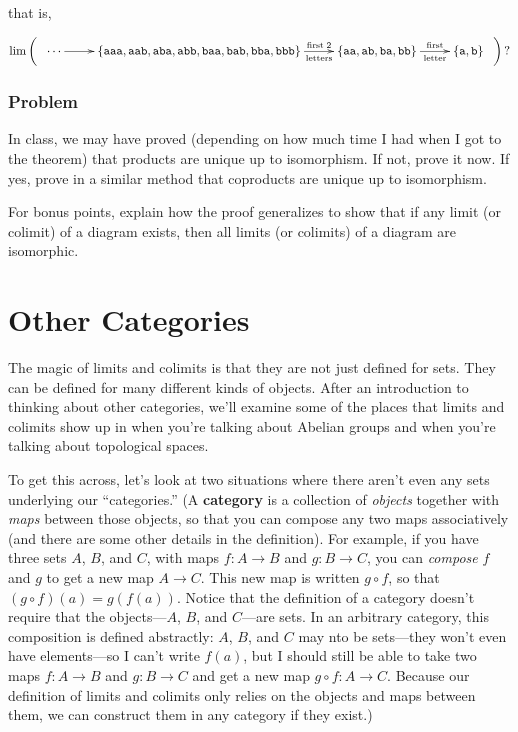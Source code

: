 \documentclass[12pt]{article}
\newcounter{problemcounter}
\newcounter{problempartcounter}
\newcommand{\problem}{\addtocounter{problemcounter}{1}\setcounter{problempartcounter}{0}\subsubsection*{Problem \theproblemcounter}}
\begin{document}
\noindent that is,

$$\textrm{lim} \left( \begin{array}{l}
\xymatrix{ \cdots\ar[r] & \{\mathtt{aaa}, \mathtt{aab}, \mathtt{aba}, \mathtt{abb}, \mathtt{baa}, \mathtt{bab}, \mathtt{bba}, \mathtt{bbb} \}\ar[r]^-{\textrm{first}\; 2}_-{\textrm{letters}} & \{\mathtt{aa}, \mathtt{ab}, \mathtt{ba}, \mathtt{bb} \}\ar[r]^-{\textrm{first}}_-{\textrm{letter}} & \{\mathtt{a}, \mathtt{b} \}}\end{array} \right)\textrm{?}$$


\problem

In class, we may have proved (depending on how much time I had when I got to the theorem) that products are unique up to isomorphism.  If not, prove it now.  If yes, prove in a similar method that coproducts are unique up to isomorphism.

For bonus points, explain how the proof generalizes to show that if any limit (or colimit) of a diagram exists, then all limits (or colimits) of a diagram are isomorphic.


\section*{Other Categories}

The magic of limits and colimits is that they are not just defined for sets.  They can be defined for many different kinds of objects.  After an introduction to thinking about other categories, we'll examine some of the places that limits and colimits show up in when you're talking about Abelian groups and when you're talking about topological spaces.

To get this across, let's look at two situations where there aren't even any sets underlying our ``categories.''  (A \textbf{category} is a collection of \textit{objects} together with \textit{maps} between those objects, so that you can compose any two maps associatively (and there are some other details in the definition).  For example, if you have three sets $A$, $B$, and $C$, with maps $f: A \rightarrow B$ and $g: B \rightarrow C$, you can \textit{compose} $f$ and $g$ to get a new map $A \rightarrow C$.  This new map is written $g \circ f$, so that $(g \circ f)(a) = g(f(a))$.  Notice that the definition of a category doesn't require that the objects---$A$, $B$, and $C$---are sets.  In an arbitrary category, this composition is defined abstractly: $A$, $B$, and $C$ may nto be sets---they won't even have elements---so I can't write $f(a)$, but I should still be able to take two maps $f: A \rightarrow B$ and $g: B \rightarrow C$ and get a new map $g \circ f: A \rightarrow C$.  Because our definition of limits and colimits only relies on the objects and maps between them, we can construct them in any category if they exist.)
\end{document}
